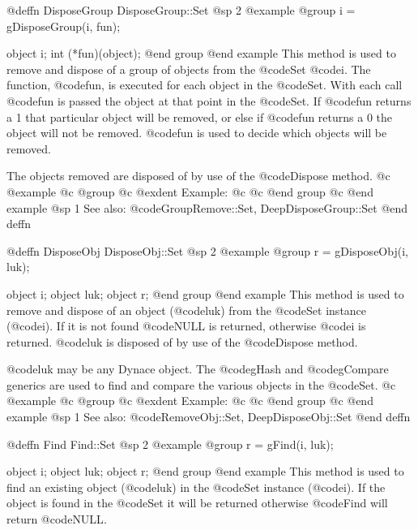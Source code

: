 @deffn {DisposeGroup} DisposeGroup::Set
@sp 2
@example
@group
i = gDisposeGroup(i, fun);

object  i;
int     (*fun)(object);
@end group
@end example
This method is used to remove and dispose of a group of objects from the
@code{Set} @code{i}.  The function, @code{fun}, is executed for each object in
the @code{Set}.  With each call @code{fun} is passed the object at that point
in the @code{Set}.  If @code{fun} returns a 1 that particular object will be
removed, or else if @code{fun} returns a 0 the object will not be
removed.  @code{fun} is used to decide which objects will be removed.

The objects removed are disposed of by use of the @code{Dispose} method.
@c @example
@c @group
@c @exdent Example:
@c 
@c @end group
@c @end example
@sp 1
See also:  @code{GroupRemove::Set, DeepDisposeGroup::Set}
@end deffn













@deffn {DisposeObj} DisposeObj::Set
@sp 2
@example
@group
r = gDisposeObj(i, luk);

object  i;
object  luk;
object  r;
@end group
@end example
This method is used to remove and dispose of an object (@code{luk}) from
the @code{Set} instance (@code{i}).  If it is not found @code{NULL} is returned,
otherwise @code{i} is returned.  @code{luk} is disposed of by use of the
@code{Dispose} method.

@code{luk} may be any Dynace object.  The @code{gHash} and
@code{gCompare} generics are used to find and compare the various
objects in the @code{Set}.
@c @example
@c @group
@c @exdent Example:
@c 
@c @end group
@c @end example
@sp 1
See also:  @code{RemoveObj::Set, DeepDisposeObj::Set}
@end deffn



















@deffn {Find} Find::Set
@sp 2
@example
@group
r = gFind(i, luk);

object  i;
object  luk;
object  r;
@end group
@end example
This method is used to find an existing object (@code{luk}) in the
@code{Set} instance (@code{i}).  If the object is found in
the @code{Set} it will be returned otherwise @code{Find} will return @code{NULL}.

